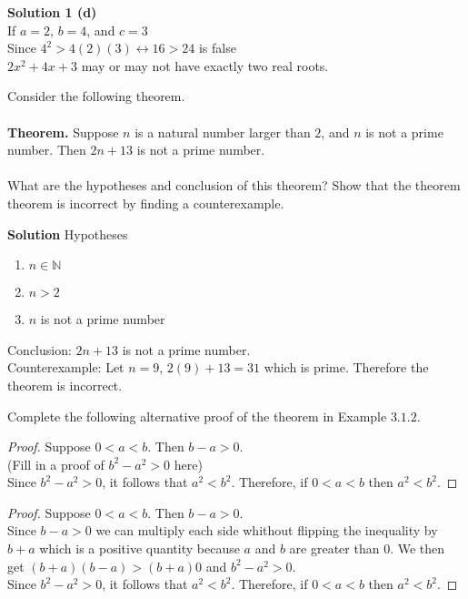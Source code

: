\textbf{Solution 1 (d)} \\
If $a = 2$, $b = 4$, and $c = 3$ \\
Since $4^2 > 4(2)(3) \leftrightarrow 16 > 24$ is false \\
$2x^2 + 4x + 3$ may or may not have exactly two real roots.

\begin{tcolorbox}[title=Problem 3, breakable]
    Consider the following theorem. \\ \\
    \textbf{Theorem.} Suppose $n$ is a natural number larger than $2$, and 
    $n$ is not a prime number. Then $2n + 13$ is not a prime number. \\ \\
    What are the hypotheses and conclusion of this theorem? Show that the 
    theorem theorem is incorrect by finding a counterexample.
\end{tcolorbox}

\textbf{Solution}
Hypotheses 
\begin{enumerate}
    \item $n \in \mathbb{N}$
    \item $n > 2$
    \item $n$ is not a prime number
\end{enumerate}
Conclusion: $2n + 13$ is not a prime number. \\
Counterexample: Let $n = 9$, $2(9) + 13 = 31$ which is prime.
Therefore the theorem is incorrect.

\begin{tcolorbox}[title=Problem 4, breakable]
    Complete the following alternative proof of the theorem in Example $3.1.2$.
    \begin{proof}
        Suppose $0 < a < b$. Then $b - a > 0$. \\   
        (Fill in a proof of $b^2 - a^2 > 0$ here) \\
        Since $b^2 - a^2 > 0$, it follows that $a^2 < b^2$. Therefore, 
        if $0 < a < b$ then $a^2 < b^2$.
    \end{proof}
\end{tcolorbox}

\begin{proof}
    Suppose $0 < a < b$. Then $b - a > 0$. \\  
    Since $b - a > 0$ we can multiply each side whithout flipping the inequality by $b+a$ which is a 
    positive quantity because $a$ and $b$ are greater than $0$. 
    We then get $(b + a)(b - a) > (b + a)0$ and $b^2 - a^2 > 0$. \\
    Since $b^2 - a^2 > 0$, it follows that $a^2 < b^2$. Therefore, if $0 < a < b$ then $a^2 < b^2$.
\end{proof}

